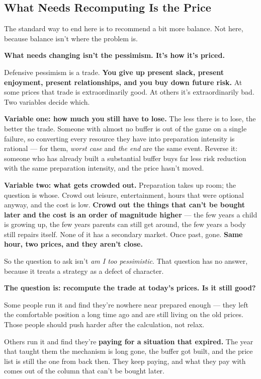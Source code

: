 \documentclass[11pt,a4paper]{article}
\begin{document}
\subsection{What Needs Recomputing Is the Price}

The standard way to end here is to recommend a bit more balance. Not here, because balance isn't where the problem is.

\textbf{What needs changing isn't the pessimism. It's how it's priced.}

Defensive pessimism is a trade. \textbf{You give up present slack, present enjoyment, present relationships, and you buy down future risk.} At some prices that trade is extraordinarily good. At others it's extraordinarily bad. Two variables decide which.

\textbf{Variable one: how much you still have to lose.} The less there is to lose, the better the trade. Someone with almost no buffer is out of the game on a single failure, so converting every resource they have into preparation intensity is rational --- for them, \textit{worst case} and \textit{the end} are the same event. Reverse it: someone who has already built a substantial buffer buys far less risk reduction with the same preparation intensity, and the price hasn't moved.

\textbf{Variable two: what gets crowded out.} Preparation takes up room; the question is whose. Crowd out leisure, entertainment, hours that were optional anyway, and the cost is low. \textbf{Crowd out the things that can't be bought later and the cost is an order of magnitude higher} --- the few years a child is growing up, the few years parents can still get around, the few years a body still repairs itself. None of it has a secondary market. Once past, gone. \textbf{Same hour, two prices, and they aren't close.}

So the question to ask isn't \textit{am I too pessimistic}. That question has no answer, because it treats a strategy as a defect of character.

\textbf{The question is: recompute the trade at today's prices. Is it still good?}

Some people run it and find they're nowhere near prepared enough --- they left the comfortable position a long time ago and are still living on the old prices. Those people should push harder after the calculation, not relax.

Others run it and find they're \textbf{paying for a situation that expired.} The year that taught them the mechanism is long gone, the buffer got built, and the price list is still the one from back then. They keep paying, and what they pay with comes out of the column that can't be bought later.
\end{document}
